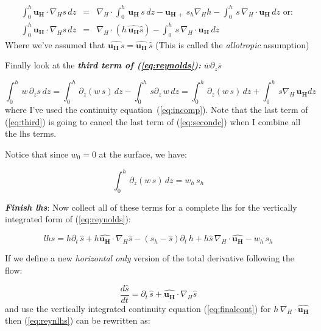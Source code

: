 \documentclass[12pt]{article}
\newcommand{\vect}[1]{\mathbf{{#1}}}
\begin{document}
\begin{subequations}
\begin{eqnarray}
  \label{eq:secondb}
  \int_0^h \vect{u_H} \cdot \nabla_H s \, dz & = &
\nabla_H \cdot \int_0^h\,\vect{u_H} \,s   \, dz - \vect{u_{H\, +}}\, s_h \nabla_H h
- \int_0^h\, s\, \nabla_H \cdot \vect{u_H} \, dz \mbox{ or: } \\
\int_0^h \vect{u_H} \cdot \nabla_H s \, dz &=& \nabla_H \cdot ( h \, \widehat{\vect{u_H}} \hat{s}) - \int_0^h\, s\, \nabla_H \cdot \vect{u_H} \, dz \label{eq:secondc}
\end{eqnarray}
\end{subequations}
Where we've assumed that $\widehat{\vect{u_H}\,s}=\widehat{\vect{u_H}}\,\hat{s} $ (This is called the \textit{allotropic}
assumption)


Finally look at the \textbf{\textit{third term of (\ref{eq:reynolds}):}} $\overline{w} \partial_z \overline{s}$

\begin{equation}
  \label{eq:third}
  \int_0^h \,  w \, \partial_z s \, dz = \int_0^h\,\partial_z ( w\,s) \, dz
- \int_0^h\,s \partial_z \, w \, dz = 
\int_0^h\,\partial_z ( w\,s) \, dz
+ \int_0^h\,s \nabla_H \, \vect{u_H} dz
\end{equation}
where I've used the continuity equation~(\ref{eq:incomp}).  Note that the last
term of (\ref{eq:third})  is going to cancel the last term of (\ref{eq:secondc}) when
I combine all the lhs terms.

Notice that since $w_0 = 0$ at the surface, we have:

\begin{equation}
  \label{eq:iter1}
  \int_0^h\,\partial_z ( w\,s) \, dz = w_h\,s_h
\end{equation}

\noindent
\textit{\textbf{Finish lhs}}: Now collect all of these terms for a complete lhs for the vertically integrated
form of (\ref{eq:reynolds}):

\begin{equation}
  \label{eq:reynlhs}
lhs = h \partial_t\, \hat{s} + h \widehat{\vect{u_H}} \cdot \nabla_H \hat{s} - (s_h - \hat{s} ) \partial_t\,h + h \hat{s} \, \nabla_H \cdot \widehat{\vect{u_H}} - w_h\,s_h  
\end{equation}

If we define a new \textit{horizontal only} version of the total derivative
following the flow:



\begin{equation}
  \label{eq:hortotal}
  \frac{d \hat{s}}{dt} = \partial_t\, \hat{s} + \widehat{\vect{u_H}} \cdot \nabla_H \hat{s}
\end{equation}
and use the vertically integrated continuity equation (\ref{eq:finalcont}) for $h\,\nabla_H \cdot \widehat{\vect{u_H}}$ then
(\ref{eq:reynlhs}) can be rewritten as:
\end{document}
